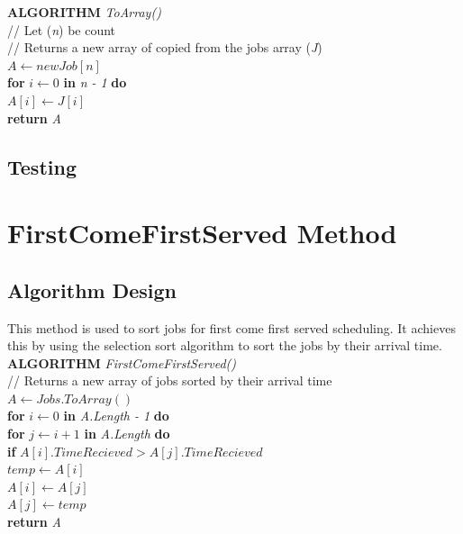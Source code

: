\documentclass[12pt,a4paper]{article}
\begin{document}
			\textbf{ALGORITHM} \textit{ToArray()}\\
			\null\hspace{1cm}// Let (\textit{n}) be count\\
			\null\hspace{1cm}// Returns a new array of copied from the jobs array (\textit{J})\\
			\null\hspace{1cm}\textit{$A \gets new Job[n]$}\\
			\null\hspace{1cm}\textbf{for} \textit{$i \gets 0$} \textbf{in} \textit{n - 1} \textbf{do}\\
			\null\hspace{2cm}\textit{$A[i] \gets J[i]$}\\
			\null\hspace{1cm}\textbf{return} \textit{A}\\
		
		\subsection{Testing}
	
	\section{FirstComeFirstServed Method}
		\subsection{Algorithm Design}
			This method is used to sort jobs for first come first served scheduling. It achieves 
			this by using the selection sort algorithm to sort the jobs by their arrival time.\\

			\textbf{ALGORITHM} \textit{FirstComeFirstServed()}\\
			\null\hspace{1cm}// Returns a new array of jobs sorted by their arrival time\\
			\null\hspace{1cm}\textit{$A \gets Jobs.ToArray()$}\\
			\null\hspace{1cm}\textbf{for} \textit{$i \gets 0$} \textbf{in} \textit{A.Length - 1} \textbf{do}\\
			\null\hspace{2cm}\textbf{for} \textit{$j \gets i + 1$} \textbf{in} \textit{A.Length} \textbf{do}\\
			\null\hspace{3cm}\textbf{if} \textit{$A[i].TimeRecieved > A[j].TimeRecieved$}\\
			\null\hspace{4cm}\textit{$temp \gets A[i]$}\\
			\null\hspace{4cm}\textit{$A[i] \gets A[j]$}\\
			\null\hspace{4cm}\textit{$A[j] \gets temp$}\\
			\null\hspace{1cm}\textbf{return} \textit{A}\\
		
\end{document}
